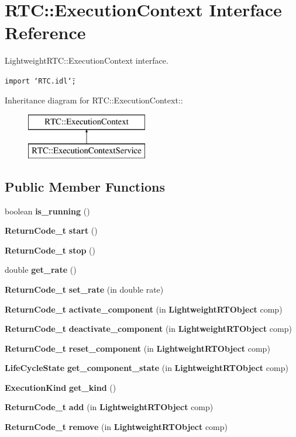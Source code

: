 \section{RTC::Execution\-Context Interface Reference}
\label{interfaceRTC_1_1ExecutionContext}
Lightweight\-RTC::Execution\-Context interface.  


{\tt import \char`\"{}RTC.idl\char`\"{};}

Inheritance diagram for RTC::Execution\-Context::\begin{figure}[H]
\begin{center}
\leavevmode
\includegraphics[height=2cm]{interfaceRTC_1_1ExecutionContext}
\end{center}
\end{figure}
\subsection*{Public Member Functions}
\begin{CompactItemize}
\item 
boolean {\bf is\_\-running} ()
\item 
{\bf Return\-Code\_\-t} {\bf start} ()
\item 
{\bf Return\-Code\_\-t} {\bf stop} ()
\item 
double {\bf get\_\-rate} ()
\item 
{\bf Return\-Code\_\-t} {\bf set\_\-rate} (in double rate)
\item 
{\bf Return\-Code\_\-t} {\bf activate\_\-component} (in {\bf Lightweight\-RTObject} comp)
\item 
{\bf Return\-Code\_\-t} {\bf deactivate\_\-component} (in {\bf Lightweight\-RTObject} comp)
\item 
{\bf Return\-Code\_\-t} {\bf reset\_\-component} (in {\bf Lightweight\-RTObject} comp)
\item 
{\bf Life\-Cycle\-State} {\bf get\_\-component\_\-state} (in {\bf Lightweight\-RTObject} comp)
\item 
{\bf Execution\-Kind} {\bf get\_\-kind} ()
\item 
{\bf Return\-Code\_\-t} {\bf add} (in {\bf Lightweight\-RTObject} comp)
\item 
{\bf Return\-Code\_\-t} {\bf remove} (in {\bf Lightweight\-RTObject} comp)
\end{CompactItemize}


